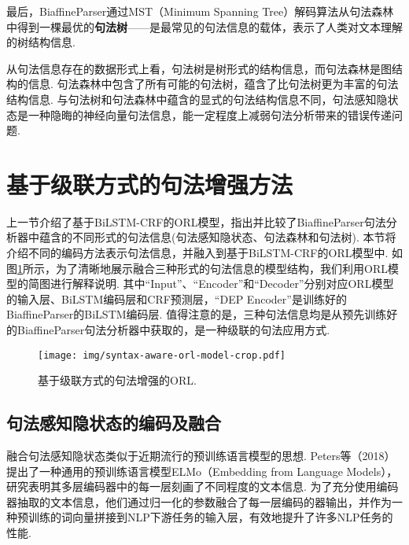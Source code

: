 最后，BiaffineParser通过MST（Minimum Spanning Tree）解码算法从句法森林中得到一棵最优的\textbf{句法树}——是最常见的句法信息的载体，表示了人类对文本理解的树结构信息.

从句法信息存在的数据形式上看，句法树是树形式的结构信息，而句法森林是图结构的信息.
句法森林中包含了所有可能的句法树，蕴含了比句法树更为丰富的句法结构信息.
与句法树和句法森林中蕴含的显式的句法结构信息不同，句法感知隐状态是一种隐晦的神经向量句法信息，能一定程度上减弱句法分析带来的错误传递问题.


\section{基于级联方式的句法增强方法}
\label{sec:orl_pipeline}

上一节介绍了基于BiLSTM-CRF的ORL模型，指出并比较了BiaffineParser句法分析器中蕴含的不同形式的句法信息(句法感知隐状态、句法森林和句法树).
本节将介绍不同的编码方法表示句法信息，并融入到基于BiLSTM-CRF的ORL模型中.
如图\ref{fig:orl_pipeline}所示，为了清晰地展示融合三种形式的句法信息的模型结构，我们利用ORL模型的简图进行解释说明. 其中“Input”、“Encoder”和“Decoder”分别对应ORL模型的输入层、BiLSTM编码层和CRF预测层，“DEP Encoder”是训练好的BiaffineParser的BiLSTM编码层.
值得注意的是，三种句法信息均是从预先训练好的BiaffineParser句法分析器中获取的，是一种级联的句法应用方式.

\begin{figure}[hb!]
    \centering
    \texttt{[image: img/syntax-aware-orl-model-crop.pdf]}
    \caption{基于级联方式的句法增强的ORL. }
    \label{fig:orl_pipeline}
\end{figure}
\subsection{句法感知隐状态的编码及融合}
融合句法感知隐状态类似于近期流行的预训练语言模型的思想. Peters等（2018）提出了一种通用的预训练语言模型ELMo（Embedding from Language Models），研究表明其多层编码器中的每一层刻画了不同程度的文本信息. 为了充分使用编码器抽取的文本信息，他们通过归一化的参数融合了每一层编码的器输出，并作为一种预训练的词向量拼接到NLP下游任务的输入层，有效地提升了许多NLP任务的性能.

